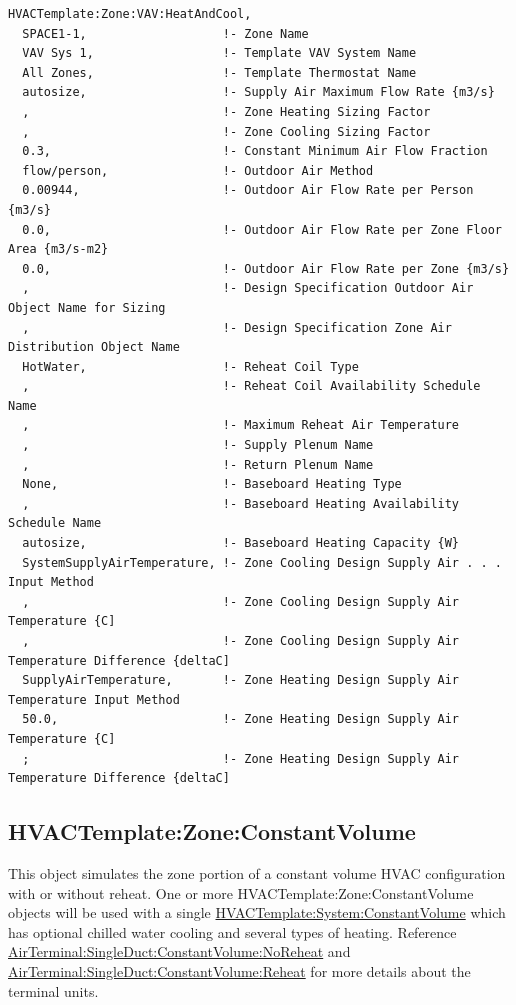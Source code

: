 \begin{lstlisting}
HVACTemplate:Zone:VAV:HeatAndCool,
  SPACE1-1,                   !- Zone Name
  VAV Sys 1,                  !- Template VAV System Name
  All Zones,                  !- Template Thermostat Name
  autosize,                   !- Supply Air Maximum Flow Rate {m3/s}
  ,                           !- Zone Heating Sizing Factor
  ,                           !- Zone Cooling Sizing Factor
  0.3,                        !- Constant Minimum Air Flow Fraction
  flow/person,                !- Outdoor Air Method
  0.00944,                    !- Outdoor Air Flow Rate per Person {m3/s}
  0.0,                        !- Outdoor Air Flow Rate per Zone Floor Area {m3/s-m2}
  0.0,                        !- Outdoor Air Flow Rate per Zone {m3/s}
  ,                           !- Design Specification Outdoor Air Object Name for Sizing
  ,                           !- Design Specification Zone Air Distribution Object Name
  HotWater,                   !- Reheat Coil Type
  ,                           !- Reheat Coil Availability Schedule Name
  ,                           !- Maximum Reheat Air Temperature
  ,                           !- Supply Plenum Name
  ,                           !- Return Plenum Name
  None,                       !- Baseboard Heating Type
  ,                           !- Baseboard Heating Availability Schedule Name
  autosize,                   !- Baseboard Heating Capacity {W}
  SystemSupplyAirTemperature, !- Zone Cooling Design Supply Air . . . Input Method
  ,                           !- Zone Cooling Design Supply Air Temperature {C]
  ,                           !- Zone Cooling Design Supply Air Temperature Difference {deltaC]
  SupplyAirTemperature,       !- Zone Heating Design Supply Air Temperature Input Method
  50.0,                       !- Zone Heating Design Supply Air Temperature {C]
  ;                           !- Zone Heating Design Supply Air Temperature Difference {deltaC]
\end{lstlisting}

\subsection{HVACTemplate:Zone:ConstantVolume}\label{hvactemplatezoneconstantvolume}

This object simulates the zone portion of a constant volume HVAC configuration with or without reheat. One or more HVACTemplate:Zone:ConstantVolume objects will be used with a single \hyperref[hvactemplatesystemconstantvolume]{HVACTemplate:System:ConstantVolume} which has optional chilled water cooling and several types of heating. Reference \hyperref[airterminalsingleductconstantvolumenoreheat]{AirTerminal:SingleDuct:ConstantVolume:NoReheat} and \hyperref[airterminalsingleductconstantvolumereheat]{AirTerminal:SingleDuct:ConstantVolume:Reheat} for more details about the terminal units.

